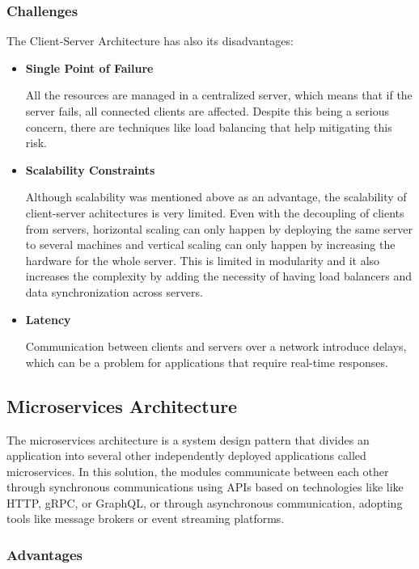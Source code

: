 \subsubsection{Challenges}
The Client-Server Architecture has also its disadvantages:
\begin{itemize}
	\item \textbf{Single Point of Failure}

	      All the resources are managed in a centralized server, which means that if
	      the server fails, all connected clients are affected. Despite this being a
	      serious concern, there are techniques like load balancing that help
	      mitigating this risk.

	\item \textbf{Scalability Constraints}

	      Although scalability was mentioned above as an advantage, the scalability
	      of client-server achitectures is very limited. Even with the decoupling of
	      clients from servers, horizontal scaling can only happen by deploying the
	      same server to several machines and vertical scaling can only happen by
	      increasing the hardware for the whole server. This is limited in modularity
	      and it also increases the complexity by adding the necessity of having
	      load balancers and data synchronization across servers.

	\item \textbf{Latency}

	      Communication between clients and servers over a network introduce delays,
	      which can be a problem for applications that require real-time
	      responses.

\end{itemize}

\subsection{Microservices Architecture}
The microservices architecture is a system design pattern that divides an
application into several other independently deployed applications called
microservices.
In this solution, the modules communicate between each other through
synchronous communications using APIs based on technologies like like
\gls{HTTP}, \gls{gRPC}, or GraphQL, or through asynchronous communication,
adopting tools like message brokers or event streaming platforms.

\subsubsection{Advantages}

